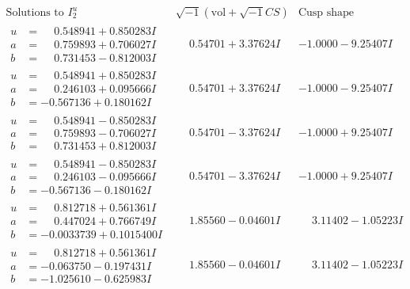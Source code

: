 \documentclass[1p]{elsarticle_modified}
\theoremstyle{definition}
\newcommand{\I}{\sqrt{-1}}
\begin{document}
$$\begin{array}{c|c|c}  
\text{Solutions to }I^u_{2}& \I (\text{vol} + \sqrt{-1}CS) & \text{Cusp shape}\\
 \hline 
\begin{aligned}
u &= \phantom{-}0.548941 + 0.850283 I \\
a &= \phantom{-}0.759893 + 0.706027 I \\
b &= \phantom{-}0.731453 - 0.812003 I\end{aligned}
 & \phantom{-}0.54701 + 3.37624 I & -1.0000 - 9.25407 I \\ \hline\begin{aligned}
u &= \phantom{-}0.548941 + 0.850283 I \\
a &= \phantom{-}0.246103 + 0.095666 I \\
b &= -0.567136 + 0.180162 I\end{aligned}
 & \phantom{-}0.54701 + 3.37624 I & -1.0000 - 9.25407 I \\ \hline\begin{aligned}
u &= \phantom{-}0.548941 - 0.850283 I \\
a &= \phantom{-}0.759893 - 0.706027 I \\
b &= \phantom{-}0.731453 + 0.812003 I\end{aligned}
 & \phantom{-}0.54701 - 3.37624 I & -1.0000 + 9.25407 I \\ \hline\begin{aligned}
u &= \phantom{-}0.548941 - 0.850283 I \\
a &= \phantom{-}0.246103 - 0.095666 I \\
b &= -0.567136 - 0.180162 I\end{aligned}
 & \phantom{-}0.54701 - 3.37624 I & -1.0000 + 9.25407 I \\ \hline\begin{aligned}
u &= \phantom{-}0.812718 + 0.561361 I \\
a &= \phantom{-}0.447024 + 0.766749 I \\
b &= -0.0033739 + 0.1015400 I\end{aligned}
 & \phantom{-}1.85560 - 0.04601 I & \phantom{-}3.11402 - 1.05223 I \\ \hline\begin{aligned}
u &= \phantom{-}0.812718 + 0.561361 I \\
a &= -0.063750 - 0.197431 I \\
b &= -1.025610 - 0.625983 I\end{aligned}
 & \phantom{-}1.85560 - 0.04601 I & \phantom{-}3.11402 - 1.05223 I \\ \hline\begin{aligned}

\end{aligned}
\end{array}$$
\end{document}
